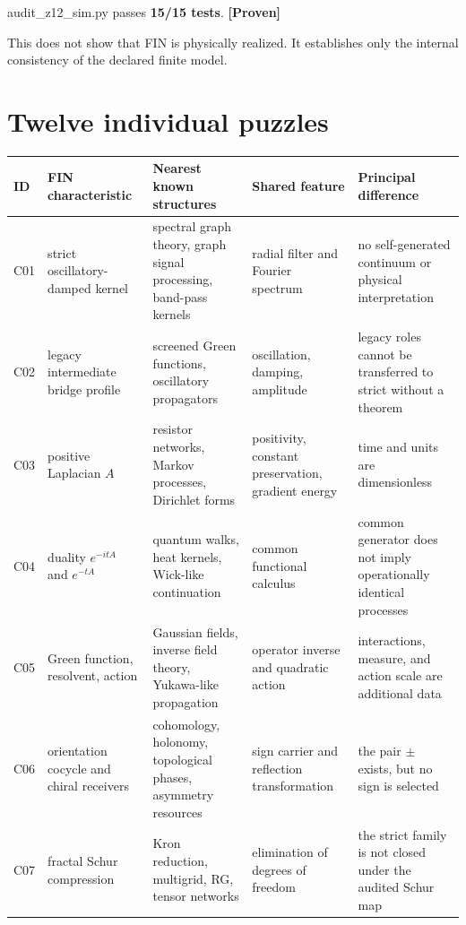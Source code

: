 \documentclass[11pt,a4paper,openany]{report}
\newcommand{\statusProven}{\textcolor{fingreen}{[Proven]}}
\begin{document}
audit\_z12\_sim.py passes \textbf{15/\allowbreak{}15 tests}. \textbf{\statusProven{}}

This does not show that FIN is physically realized. It establishes only the internal consistency of the declared finite model.

\chapter{Twelve individual puzzles}

\begin{center}
\begingroup\fontsize{7}{8.4}\selectfont
\setlength{\tabcolsep}{2.5pt}
\renewcommand{\arraystretch}{1.16}
\begin{longtable}{@{}p{}p{}p{}p{}p{}@{}}
\toprule
\textbf{ID} & \textbf{FIN characteristic} & \textbf{Nearest known structures} & \textbf{Shared feature} & \textbf{Principal difference} \\
\midrule
\endhead
C01 & strict oscillatory-damped kernel & spectral graph theory, graph signal processing, band-pass kernels & radial filter and Fourier spectrum & no self-generated continuum or physical interpretation \\
C02 & legacy intermediate bridge profile & screened Green functions, oscillatory propagators & oscillation, damping, amplitude & legacy roles cannot be transferred to strict without a theorem \\
C03 & positive Laplacian \(A\) & resistor networks, Markov processes, Dirichlet forms & positivity, constant preservation, gradient energy & time and units are dimensionless \\
C04 & duality \(e^{-itA}\) and \(e^{-tA}\) & quantum walks, heat kernels, Wick-like continuation & common functional calculus & common generator does not imply operationally identical processes \\
C05 & Green function, resolvent, action & Gaussian fields, inverse field theory, Yukawa-like propagation & operator inverse and quadratic action & interactions, measure, and action scale are additional data \\
C06 & orientation cocycle and chiral receivers & cohomology, holonomy, topological phases, asymmetry resources & sign carrier and reflection transformation & the pair \(\pm\) exists, but no sign is selected \\
C07 & fractal Schur compression & Kron reduction, multigrid, RG, tensor networks & elimination of degrees of freedom & the strict family is not closed under the audited Schur map \\

\end{longtable}
\end{center}
\end{document}
